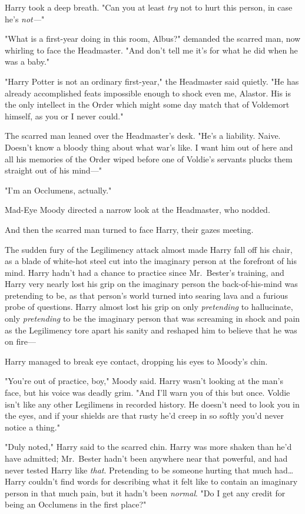 Harry took a deep breath. "Can you at least \emph{try} not to hurt this person,
in case he's \emph{not---}"

"What is a first-year doing in this room, Albus?" demanded the scarred man, now
whirling to face the Headmaster. "And don't tell me it's for what he did when
he was a baby."

"Harry Potter is not an ordinary first-year," the Headmaster said quietly. "He
has already accomplished feats impossible enough to shock even me, Alastor. His
is the only intellect in the Order which might some day match that of Voldemort
himself, as you or I never could."

The scarred man leaned over the Headmaster's desk. "He's a liability. Naive.
Doesn't know a bloody thing about what war's like. I want him out of here and
all his memories of the Order wiped before one of Voldie's servants plucks them
straight out of his mind---"

"I'm an Occlumens, actually."

Mad-Eye Moody directed a narrow look at the Headmaster, who nodded.

And then the scarred man turned to face Harry, their gazes meeting.

The sudden fury of the Legilimency attack almost made Harry fall off his chair,
as a blade of white-hot steel cut into the imaginary person at the forefront of
his mind. Harry hadn't had a chance to practice since Mr.~Bester's training,
and Harry very nearly lost his grip on the imaginary person the
back-of-his-mind was pretending to be, as that person's world turned into
searing lava and a furious probe of questions. Harry almost lost his grip on
only \emph{pretending} to hallucinate, only \emph{pretending} to be the
imaginary person that was screaming in shock and pain as the Legilimency tore
apart his sanity and reshaped him to believe that he was on fire---

Harry managed to break eye contact, dropping his eyes to Moody's chin.

"You're out of practice, boy," Moody said. Harry wasn't looking at the man's
face, but his voice was deadly grim. "And I'll warn you of this but once.
Voldie isn't like any other Legilimens in recorded history. He doesn't need to
look you in the eyes, and if your shields are that rusty he'd creep in so
softly you'd never notice a thing."

"Duly noted," Harry said to the scarred chin. Harry was more shaken than he'd
have admitted; Mr.~Bester hadn't been anywhere near that powerful, and had
never tested Harry like \emph{that}. Pretending to be someone hurting that much
had{\ldots} Harry couldn't find words for describing what it felt like to
contain an imaginary person in that much pain, but it hadn't been
\emph{normal}. "Do I get any credit for being an Occlumens in the first place?"

